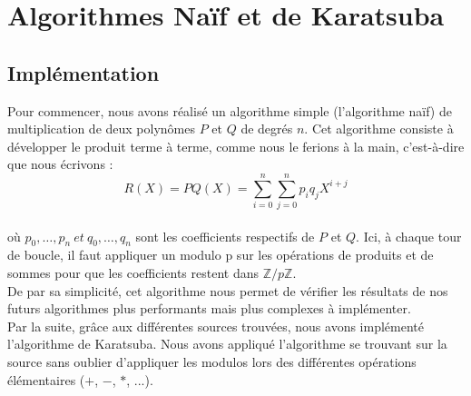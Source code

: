 \documentclass[12pt, a4paper]{article}
\begin{document}
\section{Algorithmes Naïf et de Karatsuba}
\subsection{Implémentation}

Pour commencer, nous avons réalisé un algorithme simple (l'algorithme naïf) de multiplication de deux polynômes $P$ et $Q$ de degrés $n$. Cet algorithme consiste à développer le produit terme à terme, comme nous le ferions à la main, c'est-à-dire que nous écrivons : \\
\[R(X) = PQ(X) =
\displaystyle\sum_{i=0}^{n}\sum_{j=0}^{n} p_i q_j X^{i+j}\] \\
où $p_0,\dots,p_n\ et\ q_0,\dots,q_n$ sont les coefficients respectifs de $P$ et $Q$. Ici, à chaque tour de boucle, il faut appliquer un modulo p sur les opérations de produits et de sommes pour que les coefficients restent dans $\mathbb{Z}/p\mathbb{Z}$.\\
De par sa simplicité, cet algorithme nous permet de vérifier les résultats de nos futurs algorithmes plus performants mais plus complexes à implémenter.\\
\indent Par la suite, grâce aux différentes sources 
trouvées, nous avons implémenté l'algorithme de Karatsuba. Nous avons appliqué l'algorithme se trouvant sur la source \cite{Karatsuba} sans oublier d'appliquer les modulos lors des différentes opérations élémentaires ($+$, $-$, $*$, ...).
\end{document}
